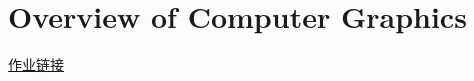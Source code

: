 
% 



\section{Overview of Computer Graphics}

\href{https://games-cn.org/forums/topic/allhw/}{作业链接}


% 
